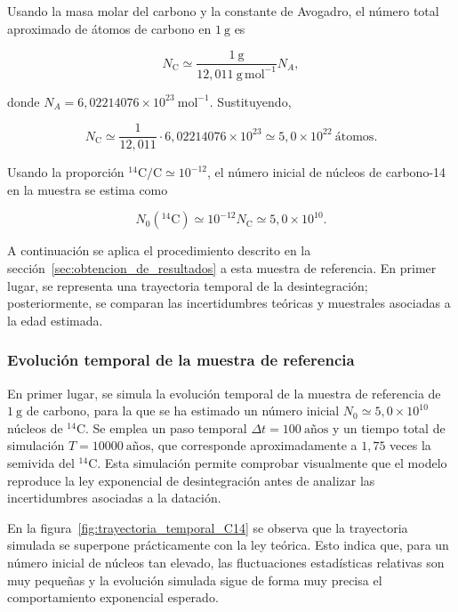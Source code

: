 \documentclass[12pt,a4paper]{article}
\begin{document}
Usando la masa molar del carbono y la constante de Avogadro, el número total aproximado de átomos de carbono en $1\ \text{g}$ es

\begin{equation}
N_{\text{C}} \simeq 
\frac{1\ \text{g}}{12{,}011\ \mathrm{g\,mol^{-1}}} N_A,
\label{eq:N_C1}
\end{equation}

donde $N_A = 6{,}02214076 \times 10^{23}\ \mathrm{mol^{-1}}$. Sustituyendo,

\begin{equation}
N_{\text{C}} \simeq 
\frac{1}{12{,}011}
\cdot 6{,}02214076 \times 10^{23}
\simeq 5{,}0 \times 10^{22}~\text{átomos}.
\label{eq:N_C2}
\end{equation}

Usando la proporción $^{14}\text{C}/\text{C} \simeq 10^{-12}$, el número inicial de núcleos de carbono-14 en la muestra se estima como

\begin{equation}
N_0({}^{14}\text{C})
\simeq 10^{-12} N_{\text{C}}
\simeq 5{,}0 \times 10^{10}.
\label{eq:N_0C14}
\end{equation}

A continuación se aplica el procedimiento descrito en la sección~\ref{sec:obtencion_de_resultados} a esta muestra de referencia. En primer lugar, se representa una trayectoria temporal de la desintegración; posteriormente, se comparan las incertidumbres teóricas y muestrales asociadas a la edad estimada.

\subsubsection{Evolución temporal de la muestra de referencia}

En primer lugar, se simula la evolución temporal de la muestra de referencia de $1\ \text{g}$ de carbono, para la que se ha estimado un número inicial $N_0 \simeq 5{,}0 \times 10^{10}$ núcleos de $^{14}\text{C}$. Se emplea un paso temporal $\Delta t = 100~\text{años}$ y un tiempo total de simulación $T = 10000~\text{años}$, que corresponde aproximadamente a $1{,}75$ veces la semivida del $^{14}\text{C}$. Esta simulación permite comprobar visualmente que el modelo reproduce la ley exponencial de desintegración antes de analizar las incertidumbres asociadas a la datación.

En la figura~\ref{fig:trayectoria_temporal_C14} se observa que la trayectoria simulada se superpone prácticamente con la ley teórica. Esto indica que, para un número inicial de núcleos tan elevado, las fluctuaciones estadísticas relativas son muy pequeñas y la evolución simulada sigue de forma muy precisa el comportamiento exponencial esperado.
\end{document}
